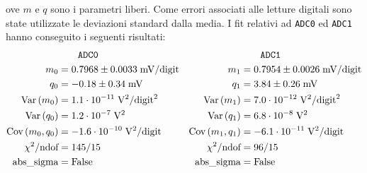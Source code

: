 \documentclass{article}[a4paper, oneside, 11pt]
\begin{document}
ove $m$ e $q$ sono i parametri liberi. Come errori associati alle letture
digitali sono state utilizzate le deviazioni standard dalla media. I fit
relativi ad \verb+ADC0+ ed \verb+ADC1+ hanno conseguito i seguenti risultati:
\begin{align*}
	&\qquad \texttt{ADC0}	&&\qquad  \texttt{ADC1} \\
	m_0 &= 0.7968 \pm  0.0033  \; \mathrm{mV/digit} 
	& m_1  &= 0.7954 \pm 0.0026  \; \mathrm{mV/digit} \\
	q_0 &= - 0.18 \pm 0.34  \; \mathrm{mV} 	
	&q_1 &= 3.84  \pm 0.26  \; \mathrm{mV} \\
	\text{Var}\left(m_0\right)  &= 1.1 \cdot 10^{-11}  \; \mathrm{V}^2 /\mathrm{digit}^2
	&\text{Var}\left(m_1\right) &= 7.0 \cdot 10^{-12}  \; \mathrm{V}^2 /\mathrm{digit}^2 \\
	\text{Var}\left(q_0\right) &=1.2 \cdot 10^{-7} \; \mathrm{V}^2
	&\text{Var}\left(q_1\right) &= 6.8 \cdot 10^{-8} \; \mathrm{V}^2 \\
	\text{Cov}\left(m_0, q_0\right) &= - 1.6 \cdot 10^{-10} \; \mathrm{V}^2 /\mathrm{digit}
        &\text{Cov}\left(m_1, q_1\right) &= - 6.1 \cdot 10^{-11} \;
	\mathrm{V}^2 /\mathrm{digit} \\
	\chi^2/\text{ndof} &= 145/15	&\chi^2/\text{ndof} &= 96/15 \\ 
	\text{abs\_sigma} &= \rm False	&\text{abs\_sigma} &= \rm False
\end{align*}
\end{document}
